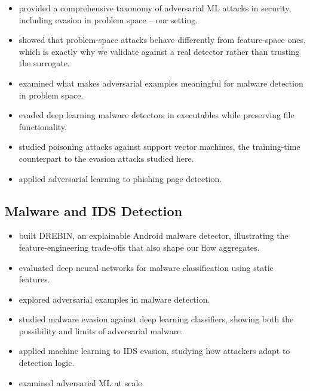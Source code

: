 \documentclass[12pt,a4paper]{report}
\begin{document}
\begin{itemize}
  \item \citet{demetrio2021adversarial} provided a comprehensive taxonomy of adversarial ML attacks in security, including evasion in problem space -- our setting.
  
  \item \citet{demetrio2020intriguing} showed that problem-space attacks behave differently from feature-space ones, which is exactly why we validate against a real detector rather than trusting the surrogate.
  
  \item \citet{pierazzi2019intriguing} examined what makes adversarial examples meaningful for malware detection in problem space.
  
  \item \citet{demetrio2019adversarial} evaded deep learning malware detectors in executables while preserving file functionality.
  
  \item \citet{melis2016poisoning} studied poisoning attacks against support vector machines, the training-time counterpart to the evasion attacks studied here.
  
  \item \citet{anderson2018deep} applied adversarial learning to phishing page detection.
\end{itemize}

\subsection{Malware and IDS Detection}

\begin{itemize}
  \item \citet{arp2016drebin} built DREBIN, an explainable Android malware detector, illustrating the feature-engineering trade-offs that also shape our flow aggregates.
  
  \item \citet{saxe2015deep} evaluated deep neural networks for malware classification using static features.
  
  \item \citet{severi2018exploring} explored adversarial examples in malware detection.
  
  \item \citet{mosli2018towards} studied malware evasion against deep learning classifiers, showing both the possibility and limits of adversarial malware.
  
  \item \citet{silva2017ids} applied machine learning to IDS evasion, studying how attackers adapt to detection logic.
  
  \item \citet{reuben2021adversarial} examined adversarial ML at scale.
\end{itemize}
\end{document}

